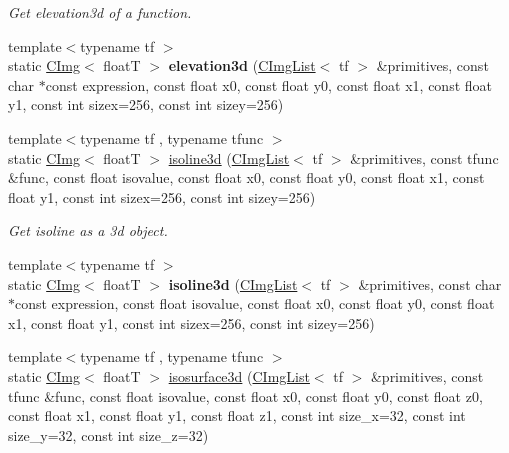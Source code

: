 \begin{DoxyCompactItemize}
\begin{DoxyCompactList}\small\item\em Get elevation3d of a function. \item\end{DoxyCompactList}\item 
\hypertarget{structcimg__library_1_1CImg_a1c0ed26457a19a4b09f1af640e820fa8}{
{\footnotesize template$<$typename tf $>$ }\\static \hyperlink{structcimg__library_1_1CImg}{CImg}$<$ floatT $>$ {\bfseries elevation3d} (\hyperlink{structcimg__library_1_1CImgList}{CImgList}$<$ tf $>$ \&primitives, const char $\ast$const expression, const float x0, const float y0, const float x1, const float y1, const int sizex=256, const int sizey=256)}
\label{structcimg__library_1_1CImg_a1c0ed26457a19a4b09f1af640e820fa8}

\item 
\hypertarget{structcimg__library_1_1CImg_a46d5d36453874d757b3c98abb5c02d39}{
{\footnotesize template$<$typename tf , typename tfunc $>$ }\\static \hyperlink{structcimg__library_1_1CImg}{CImg}$<$ floatT $>$ \hyperlink{structcimg__library_1_1CImg_a46d5d36453874d757b3c98abb5c02d39}{isoline3d} (\hyperlink{structcimg__library_1_1CImgList}{CImgList}$<$ tf $>$ \&primitives, const tfunc \&func, const float isovalue, const float x0, const float y0, const float x1, const float y1, const int sizex=256, const int sizey=256)}
\label{structcimg__library_1_1CImg_a46d5d36453874d757b3c98abb5c02d39}

\begin{DoxyCompactList}\small\item\em Get isoline as a 3d object. \item\end{DoxyCompactList}\item 
\hypertarget{structcimg__library_1_1CImg_ad3731de457d683d69528606ed7775f02}{
{\footnotesize template$<$typename tf $>$ }\\static \hyperlink{structcimg__library_1_1CImg}{CImg}$<$ floatT $>$ {\bfseries isoline3d} (\hyperlink{structcimg__library_1_1CImgList}{CImgList}$<$ tf $>$ \&primitives, const char $\ast$const expression, const float isovalue, const float x0, const float y0, const float x1, const float y1, const int sizex=256, const int sizey=256)}
\label{structcimg__library_1_1CImg_ad3731de457d683d69528606ed7775f02}

\item 
\hypertarget{structcimg__library_1_1CImg_ac5bb7125f82c9cf41b587f4ef15d695f}{
{\footnotesize template$<$typename tf , typename tfunc $>$ }\\static \hyperlink{structcimg__library_1_1CImg}{CImg}$<$ floatT $>$ \hyperlink{structcimg__library_1_1CImg_ac5bb7125f82c9cf41b587f4ef15d695f}{isosurface3d} (\hyperlink{structcimg__library_1_1CImgList}{CImgList}$<$ tf $>$ \&primitives, const tfunc \&func, const float isovalue, const float x0, const float y0, const float z0, const float x1, const float y1, const float z1, const int size\_\-x=32, const int size\_\-y=32, const int size\_\-z=32)}
\label{structcimg__library_1_1CImg_ac5bb7125f82c9cf41b587f4ef15d695f}


\end{DoxyCompactItemize}
